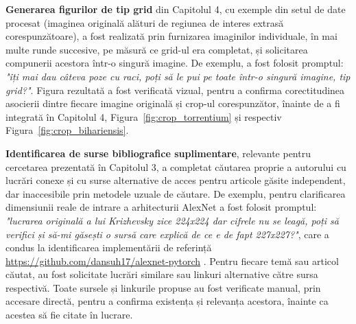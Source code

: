 \documentclass[12pt,a4paper]{report}
\theoremstyle{definition}
\theoremstyle{remark}
\begin{document}
\textbf{Generarea figurilor de tip grid} din Capitolul 4, cu exemple din setul de date procesat (imaginea originală alături de regiunea de interes extrasă corespunzătoare), a fost realizată prin furnizarea imaginilor individuale, în mai multe runde succesive, pe măsură ce grid-ul era completat, și solicitarea compunerii acestora într-o singură imagine. De exemplu, a fost folosit promptul: \textit{"îți mai dau câteva poze cu raci, poți să le pui pe toate într-o singură imagine, tip grid?"}. Figura rezultată a fost verificată vizual, pentru a confirma corectitudinea asocierii dintre fiecare imagine originală și crop-ul corespunzător, înainte de a fi integrată în Capitolul 4,  Figura~\ref{fig:crop_torrentium} și respectiv Figura~\ref{fig:crop_bihariensis}.

\textbf{Identificarea de surse bibliografice suplimentare}, relevante pentru cercetarea prezentată în Capitolul 3, a completat căutarea proprie a autorului cu lucrări conexe și cu surse alternative de acces pentru articole găsite independent, dar inaccesibile prin metodele uzuale de căutare. De exemplu, pentru clarificarea dimensiunii reale de intrare a arhitecturii AlexNet a fost folosit promptul: \textit{"lucrarea originală a lui Krizhevsky zice 224x224 dar cifrele nu se leagă, poți să verifici și să-mi găsești o sursă care explică de ce e de fapt 227x227?"}, care a condus la identificarea implementării de referință \url{https://github.com/dansuh17/alexnet-pytorch} \cite{suh2018alexnet}. Pentru fiecare temă sau articol căutat, au fost solicitate lucrări similare sau linkuri alternative către sursa respectivă. Toate sursele și linkurile propuse au fost verificate manual, prin accesare directă, pentru a confirma existența și relevanța acestora, înainte ca acestea să fie citate în lucrare.
\end{document}
